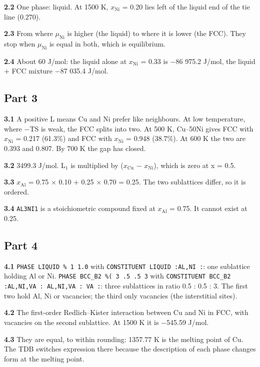 \documentclass[12pt,a4paper]{article}
\begin{document}
\textbf{2.2} One phase: liquid. At 1500 K, \(x_{\mathrm{Ni}}\) = 0.20 lies left of the liquid end of the tie line (0.270).

\textbf{2.3} From where \(\mu_{\mathrm{Ni}}\) is higher (the liquid) to where it is lower (the FCC). They stop when \(\mu_{\mathrm{Ni}}\) is equal in both, which is equilibrium.

\textbf{2.4} About 60 J/mol: the liquid alone at \(x_{\mathrm{Ni}}\) = 0.33 is \(-\)86 975.2 J/mol, the liquid + FCC mixture \(-\)87 035.4 J/mol.


\subsection*{Part 3}
\textbf{3.1} A positive L means Cu and Ni prefer like neighbours. At low temperature, where \(-\)TS is weak, the FCC splits into two. At 500 K, Cu--50Ni gives FCC with \(x_{\mathrm{Ni}}\) = 0.217 (61.3\%) and FCC with \(x_{\mathrm{Ni}}\) = 0.948 (38.7\%). At 600 K the two are 0.393 and 0.807. By 700 K the gap has closed.

\textbf{3.2} 3499.3 J/mol. L\(_{1}\) is multiplied by (\(x_{\mathrm{Cu}}\) \(-\) \(x_{\mathrm{Ni}}\)), which is zero at x = 0.5.

\textbf{3.3} \(x_{\mathrm{Al}}\) = 0.75 \(\times\) 0.10 + 0.25 \(\times\) 0.70 = 0.25. The two sublattices differ, so it is ordered.

\textbf{3.4} \texttt{AL3NI1} is a stoichiometric compound fixed at \(x_{\mathrm{Al}}\) = 0.75. It cannot exist at 0.25.


\subsection*{Part 4}
\textbf{4.1} \texttt{PHASE LIQUID \% 1 1.\allowbreak{}0} with \texttt{CONSTITUENT LIQUID :AL,\allowbreak{}NI :}: one sublattice holding Al or Ni. \texttt{PHASE BCC\_\allowbreak{}B2 \%( 3 .\allowbreak{}5 .\allowbreak{}5 3} with \texttt{CONSTITUENT BCC\_\allowbreak{}B2 :AL,\allowbreak{}NI,\allowbreak{}VA : AL,\allowbreak{}NI,\allowbreak{}VA : VA :}: three sublattices in ratio 0.5 : 0.5 : 3. The first two hold Al, Ni or vacancies; the third only vacancies (the interstitial sites).

\textbf{4.2} The first-order Redlich--Kister interaction between Cu and Ni in FCC, with vacancies on the second sublattice. At 1500 K it is \(-\)545.59 J/mol.

\textbf{4.3} They are equal, to within rounding: 1357.77 K is the melting point of Cu. The TDB switches expression there because the description of each phase changes form at the melting point.
\end{document}
